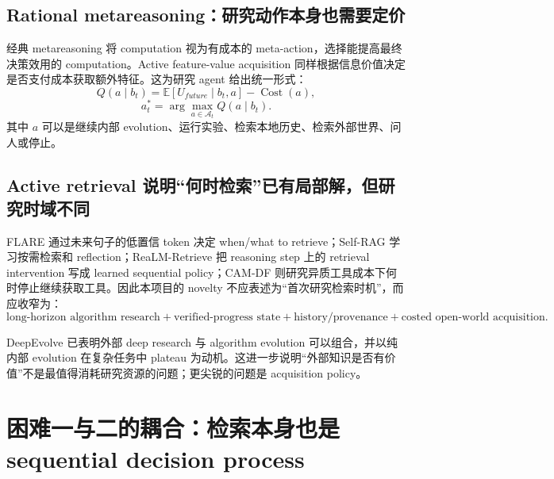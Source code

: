 \documentclass[11pt,a4paper]{ctexart}
\newcommand{\E}{\mathbb{E}}
\newcommand{\A}{\mathcal{A}}
\newcommand{\Cost}{\operatorname{Cost}}
\begin{document}
\subsection{Rational metareasoning：研究动作本身也需要定价}

经典 metareasoning 将 computation 视为有成本的 meta-action，选择能提高最终决策效用的 computation\parencite{russell1991metareasoning,hay2012selecting}。Active feature-value acquisition 同样根据信息价值决定是否支付成本获取额外特征\parencite{saar2009activefeature}。这为研究 agent 给出统一形式：
\begin{equation}
 Q(a\mid b_t)=\E[U_{future}\mid b_t,a]-\Cost(a),
\end{equation}
\begin{equation}
 a_t^*=\arg\max_{a\in\A_t}Q(a\mid b_t).
\end{equation}
其中 $a$ 可以是继续内部 evolution、运行实验、检索本地历史、检索外部世界、问人或停止。

\subsection{Active retrieval 说明“何时检索”已有局部解，但研究时域不同}

FLARE 通过未来句子的低置信 token 决定 when/what to retrieve\parencite{jiang2023flare}；Self-RAG 学习按需检索和 reflection\parencite{asai2024selfrag}；ReaLM-Retrieve 把 reasoning step 上的 retrieval intervention 写成 learned sequential policy\parencite{guo2026realm}；CAM-DF 则研究异质工具成本下何时停止继续获取工具\parencite{feng2026camdf}。因此本项目的 novelty 不应表述为“首次研究检索时机”，而应收窄为：
\begin{equation}
\boxed{\text{long-horizon algorithm research}+\text{verified-progress state}+\text{history/provenance}+\text{costed open-world acquisition}.}
\end{equation}

DeepEvolve 已表明外部 deep research 与 algorithm evolution 可以组合，并以纯内部 evolution 在复杂任务中 plateau 为动机\parencite{liu2025deepevolve}。这进一步说明“外部知识是否有价值”不是最值得消耗研究资源的问题；更尖锐的问题是 acquisition policy。

\section{困难一与二的耦合：检索本身也是 sequential decision process}
\end{document}

